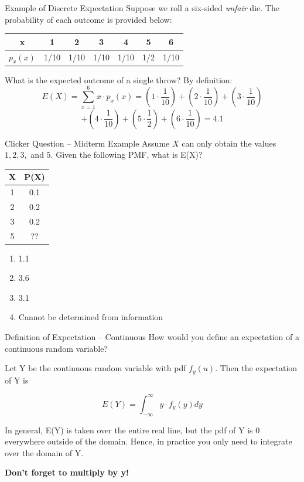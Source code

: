 \documentclass{beamer}
\begin{document}
\begin{frame}{Example of Discrete Expectation}
	Suppose we roll a six-sided \textit{unfair} die. The probability of each outcome is provided below:
		\begin{center}
		\begin{tabular}{| c | c | c | c | c | c | c|}
			\hline
			x        & 1    & 2    & 3    & 4    & 5   & 6    \\[0.25ex]
			\hline
			$p_x(x)$ & 1/10 & 1/10 & 1/10 & 1/10 & 1/2 & 1/10 \\
			\hline
		\end{tabular}
	\end{center}
		What is the expected outcome of a single throw? By definition:
	$$E(X) = \sum_{x=1}^6 x\cdot p_x(x) = (1\cdot \frac{1}{10}) + (2\cdot \frac{1}{10}) + (3\cdot \frac{1}{10})$$
	$$ + (4\cdot \frac{1}{10}) + (5\cdot \frac{1}{2}) + (6\cdot \frac{1}{10}) = 4.1$$
\end{frame}

\begin{frame}{Clicker Question -- Midterm Example}
	Assume $X$ can only obtain the values $1, 2, 3,$ and $5$. Given the following PMF, what is E(X)?
	\begin{center}
		\begin{tabular}{|c|c|}
			\hline
			X & P(X) \\
			\hline
			1 & 0.1  \\
			2 & 0.2  \\
			3 & 0.2  \\
			5 & ??   \\
			\hline
		\end{tabular}
	\end{center}
	\begin{enumerate}[label=(\alph*)]
		\item 1.1
		\item 3.6
		\item 3.1
		\item Cannot be determined from information
	\end{enumerate}
\end{frame}




\begin{frame}{Definition of Expectation -- Continuous}
	How would you define an expectation of a continuous random variable?
	
	Let Y be the continuous random variable with pdf $f_y(u)$. Then the expectation of Y is

	\[ 
		E(Y)= \int^\infty_{-\infty}y \cdot f_y(y) dy
	\]

	In general, E(Y) is taken over the entire real line, but the pdf of Y is 0 everywhere outside of the domain. Hence, in practice you only need to integrate over the domain of Y. 
	
	\textbf{Don't forget to multiply by y!}
\end{frame}
\end{document}
